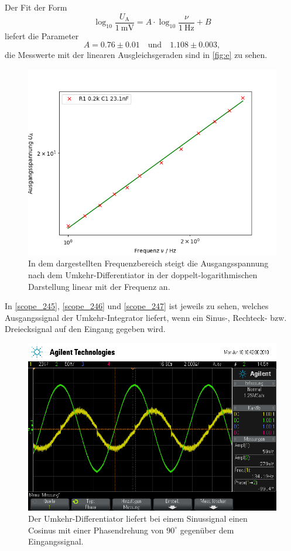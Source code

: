 Der Fit der Form
\begin{equation}
	\log_{10} \frac{U_\text{A}}{\SI{1}{\milli\volt}} = A \cdot \log_{10} \frac{\nu}{\SI{1}{\hertz}} + B
\end{equation}
liefert die Parameter
\begin{equation}
	A = 0.76 \pm 0.01 \quad \text{und} \quad 1.108 \pm 0.003,
\end{equation}
die Messwerte mit der linearen Ausgleichsgeraden sind in \autoref{fig:e} zu sehen.
\begin{figure}[h]
	\centering
	\includegraphics[width=\textwidth]{img/e.png}
	\caption{In dem dargestellten Frequenzbereich steigt die Ausgangsspannung nach dem Umkehr-Differentiator in der doppelt-logarithmischen Darstellung linear mit der Frequenz an.}
	\label{fig:e}
\end{figure}
In \autoref{scope_245}, \autoref{scope_246} und \autoref{scope_247} ist jeweils zu sehen, welches Ausgangssignal der Umkehr-Integrator liefert, wenn ein Sinus-, Rechteck- bzw. Dreiecksignal auf den Eingang gegeben wird.
\begin{figure}[h]
	\centering
	\includegraphics[width=\textwidth]{usb/scope_245.png}
	\caption{Der Umkehr-Differentiator liefert bei einem Sinussignal einen Cosinus mit einer Phasendrehung von $90^\circ$ gegenüber dem Eingangssignal.}
	\label{scope_245}
\end{figure}
